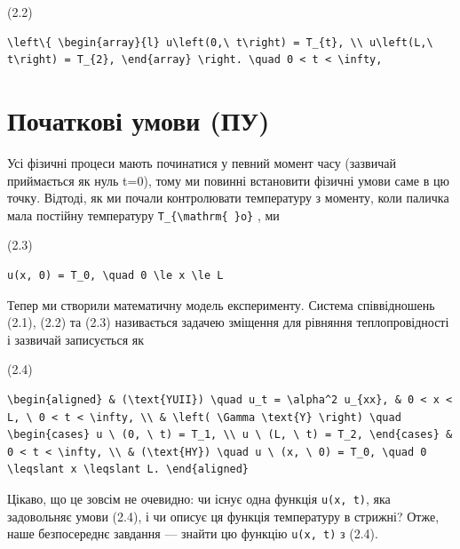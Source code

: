 \documentclass[
  ukrainian,
]{article}
\begin{document}
(2.2)

\begin{verbatim}
\left\{ \begin{array}{l} u\left(0,\ t\right) = T_{t}, \\ u\left(L,\ t\right) = T_{2}, \end{array} \right. \quad 0 < t < \infty,
\end{verbatim}

\section{Початкові умови
(ПУ)}\label{ux43fux43eux447ux430ux442ux43aux43eux432ux456-ux443ux43cux43eux432ux438-ux43fux443}

Усі фізичні процеси мають починатися у певний момент часу (зазвичай
приймається як нуль t=0), тому ми повинні встановити фізичні умови саме
в цю точку. Відтоді, як ми почали контролювати температуру з моменту,
коли паличка мала постійну температуру
\texttt{T\_\{\textbackslash{}mathrm\{\ \}o\}} , ми

(2.3)

\begin{verbatim}
u(x, 0) = T_0, \quad 0 \le x \le L
\end{verbatim}

Тепер ми створили математичну модель експерименту. Система співвідношень
(2.1), (2.2) та (2.3) називається задачею зміщення для рівняння
теплопровідності і зазвичай записується як

(2.4)

\begin{verbatim}
\begin{aligned} & (\text{YUII}) \quad u_t = \alpha^2 u_{xx}, & 0 < x < L, \ 0 < t < \infty, \\ & \left( \Gamma \text{Y} \right) \quad \begin{cases} u \ (0, \ t) = T_1, \\ u \ (L, \ t) = T_2, \end{cases} & 0 < t < \infty, \\ & (\text{HY}) \quad u \ (x, \ 0) = T_0, \quad 0 \leqslant x \leqslant L. \end{aligned}
\end{verbatim}

Цікаво, що це зовсім не очевидно: чи існує одна функція
\texttt{u(x,\ t)}, яка задовольняє умови (2.4), і чи описує ця функція
температуру в стрижні? Отже, наше безпосереднє завдання --- знайти цю
функцію \texttt{u(x,\ t)} з (2.4).
\end{document}
